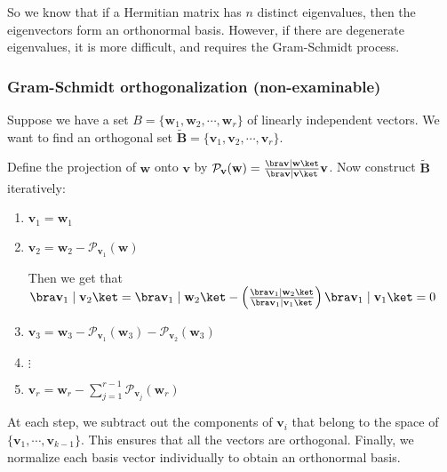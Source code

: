 \documentclass[a4paper]{article}
\begin{document}
So we know that if a Hermitian matrix has $n$ distinct eigenvalues, then the eigenvectors form an orthonormal basis. However, if there are degenerate eigenvalues, it is more difficult, and requires the Gram-Schmidt process.

\subsubsection{Gram-Schmidt orthogonalization (non-examinable)}
Suppose we have a set $B = \{\mathbf{w}_1, \mathbf{w}_2, \cdots, \mathbf{w}_r\}$ of linearly independent vectors. We want to find an orthogonal set $\tilde{\mathbf{B}} = \{\mathbf{v}_1, \mathbf{v}_2, \cdots, \mathbf{v}_r\}$.

Define the projection of $\mathbf{w}$ onto $\mathbf{v}$ by $\mathcal{P}_\mathbf{v}(\mathbf{w}) = \frac{\bra \mathbf{v}\mid \mathbf{w}\ket}{\bra \mathbf{v}\mid \mathbf{v}\ket} \mathbf{v}$. Now construct $\tilde{\mathbf{B}}$ iteratively:
\begin{enumerate}
  \item $\mathbf{v}_1 = \mathbf{w}_1$
  \item $\mathbf{v}_2 = \mathbf{w}_2 - \mathcal{P}_{\mathbf{v}_1}(\mathbf{w})$

    Then we get that $\bra \mathbf{v}_1\mid \mathbf{v}_2\ket = \bra \mathbf{v}_1\mid \mathbf{w}_2\ket - \left(\frac{\bra \mathbf{v}_1\mid \mathbf{w}_2\ket}{\bra \mathbf{v}_1 \mid \mathbf{v}_1\ket}\right) \bra \mathbf{v}_1\mid \mathbf{v}_1\ket = 0$
  \item $\mathbf{v}_3 = \mathbf{w}_3 - \mathcal{P}_{\mathbf{v}_1}(\mathbf{w}_3) - \mathcal{P}_{\mathbf{v}_2}(\mathbf{w}_3)$
  \item $\vdots$
  \item $\displaystyle \mathbf{v}_r = \mathbf{w}_r - \sum_{j = 1}^{r - 1} \mathcal{P}_{\mathbf{v}_j}(\mathbf{w}_r)$
\end{enumerate}
At each step, we subtract out the components of $\mathbf{v}_i$ that belong to the space of $\{\mathbf{v}_1, \cdots, \mathbf{v}_{k - 1}\}$. This ensures that all the vectors are orthogonal. Finally, we normalize each basis vector individually to obtain an orthonormal basis.
\end{document}
